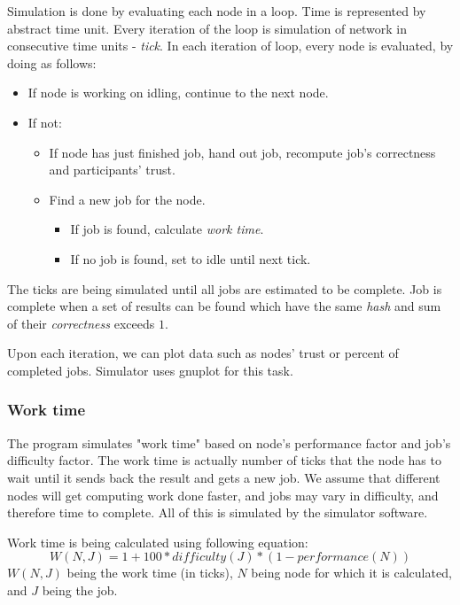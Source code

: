 Simulation is done by evaluating each node in a loop. Time is represented by abstract time unit. Every iteration of the loop is simulation of network in consecutive time units - \emph{tick}. In each iteration of loop, every node is evaluated, by doing as follows:
\begin{itemize}
	\item If node is working on idling, continue to the next node.
	\item If not: \begin{itemize}
		\item If node has just finished job, hand out job, recompute job's correctness and participants' trust.
		\item Find a new job for the node. \begin{itemize}
			\item If job is found, calculate \emph{work time}.
			\item If no job is found, set to idle until next tick. 
		\end{itemize}
	\end{itemize}
\end{itemize}

The ticks are being simulated until all jobs are estimated to be complete. Job is complete when a set of results can be found which have the same \emph{hash} and sum of their \emph{correctness} exceeds $1$.

Upon each iteration, we can plot data such as nodes' trust or percent of completed jobs. Simulator uses gnuplot for this task.

\subsubsection{Work time}
\label{s:worktime}

The program simulates "work time" based on node's performance factor and job's difficulty factor. The work time is actually number of ticks that the node has to wait until it sends back the result and gets a new job. We assume that different nodes will get computing work done faster, and jobs may vary in difficulty, and therefore time to complete. All of this is simulated by the simulator software.

Work time is being calculated using following equation:
\begin{equation}
W(N, J) = 1 + 100 * difficulty(J) * (1 - performance(N))
\end{equation}
$W(N, J)$ being the work time (in ticks), $N$ being node for which it is calculated, and $J$ being the job.

